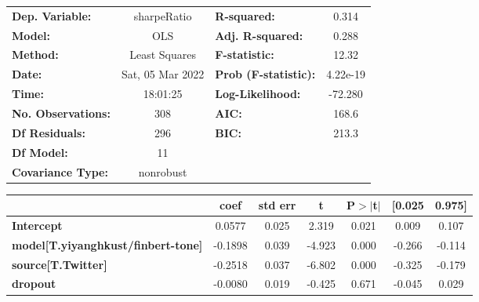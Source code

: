 \begin{center}
\begin{tabular}{lclc}
\toprule
\textbf{Dep. Variable:}                    &   sharpeRatio    & \textbf{  R-squared:         } &     0.314   \\
\textbf{Model:}                            &       OLS        & \textbf{  Adj. R-squared:    } &     0.288   \\
\textbf{Method:}                           &  Least Squares   & \textbf{  F-statistic:       } &     12.32   \\
\textbf{Date:}                             & Sat, 05 Mar 2022 & \textbf{  Prob (F-statistic):} &  4.22e-19   \\
\textbf{Time:}                             &     18:01:25     & \textbf{  Log-Likelihood:    } &   -72.280   \\
\textbf{No. Observations:}                 &         308      & \textbf{  AIC:               } &     168.6   \\
\textbf{Df Residuals:}                     &         296      & \textbf{  BIC:               } &     213.3   \\
\textbf{Df Model:}                         &          11      & \textbf{                     } &             \\
\textbf{Covariance Type:}                  &    nonrobust     & \textbf{                     } &             \\
\bottomrule
\end{tabular}
\begin{tabular}{lcccccc}
                                           & \textbf{coef} & \textbf{std err} & \textbf{t} & \textbf{P$> |$t$|$} & \textbf{[0.025} & \textbf{0.975]}  \\
\midrule
\textbf{Intercept}                         &       0.0577  &        0.025     &     2.319  &         0.021        &        0.009    &        0.107     \\
\textbf{model[T.yiyanghkust/finbert-tone]} &      -0.1898  &        0.039     &    -4.923  &         0.000        &       -0.266    &       -0.114     \\
\textbf{source[T.Twitter]}                 &      -0.2518  &        0.037     &    -6.802  &         0.000        &       -0.325    &       -0.179     \\
\textbf{dropout}                           &      -0.0080  &        0.019     &    -0.425  &         0.671        &       -0.045    &        0.029     \\

\end{tabular}
\end{center}
